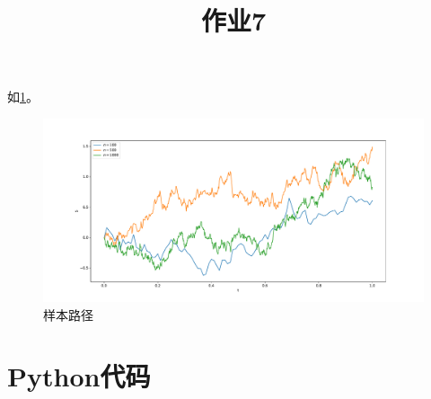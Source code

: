 \documentclass[cn]{homework}
\title{作业7}
\begin{document}
    \maketitle
    如\cref{fig:sample-path}。
    \begin{figure}[h]
        \centering
        \includegraphics[width=\textwidth]{sample-path}
        \caption{样本路径}
        \label{fig:sample-path}
    \end{figure}
    \appendix
    \section{Python代码}
    
\end{document}
